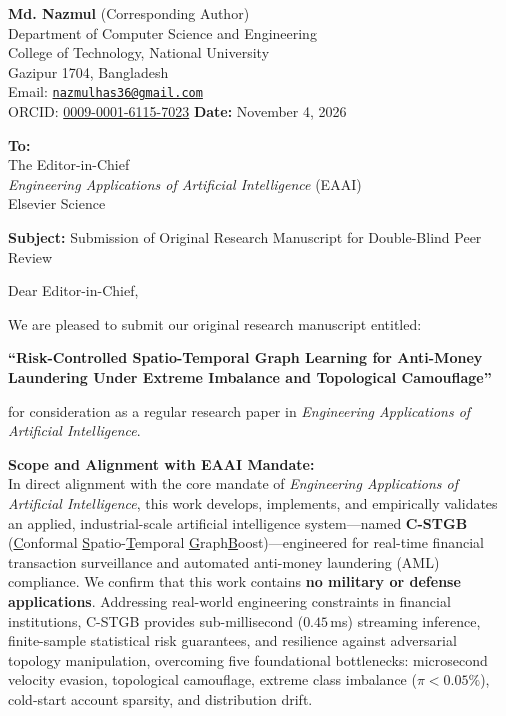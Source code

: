 \documentclass[11pt,a4paper]{article}
\begin{document}
\pagestyle{empty}

\noindent
\textbf{Md. Nazmul} (Corresponding Author) \\
Department of Computer Science and Engineering \\
College of Technology, National University \\
Gazipur 1704, Bangladesh \\
Email: \href{mailto:nazmulhas36@gmail.com}{\texttt{nazmulhas36@gmail.com}} \\
ORCID: \href{https://orcid.org/0009-0001-6115-7023}{0009-0001-6115-7023} \hfill \textbf{Date:} November 4, 2026

\vspace{1.2em}
\noindent
\textbf{To:} \\
The Editor-in-Chief \\
\textit{Engineering Applications of Artificial Intelligence} (EAAI) \\
Elsevier Science

\vspace{1.2em}
\noindent
\textbf{Subject:} Submission of Original Research Manuscript for Double-Blind Peer Review

\vspace{0.8em}
\noindent
Dear Editor-in-Chief,

\vspace{0.6em}
\noindent
We are pleased to submit our original research manuscript entitled:

\begin{center}
\textbf{``Risk-Controlled Spatio-Temporal Graph Learning for Anti-Money Laundering Under Extreme Imbalance and Topological Camouflage''}
\end{center}

\noindent
for consideration as a regular research paper in \textit{Engineering Applications of Artificial Intelligence}.

\vspace{0.6em}
\noindent
\textbf{Scope and Alignment with EAAI Mandate:}\\
In direct alignment with the core mandate of \textit{Engineering Applications of Artificial Intelligence}, this work develops, implements, and empirically validates an applied, industrial-scale artificial intelligence system---named \textbf{C-STGB} (\underline{C}onformal \underline{S}patio-\underline{T}emporal \underline{G}raph\underline{B}oost)---engineered for real-time financial transaction surveillance and automated anti-money laundering (AML) compliance. We confirm that this work contains \textbf{no military or defense applications}. Addressing real-world engineering constraints in financial institutions, C-STGB provides sub-millisecond ($0.45$\,ms) streaming inference, finite-sample statistical risk guarantees, and resilience against adversarial topology manipulation, overcoming five foundational bottlenecks: microsecond velocity evasion, topological camouflage, extreme class imbalance ($\pi < 0.05\%$), cold-start account sparsity, and distribution drift.
\end{document}
